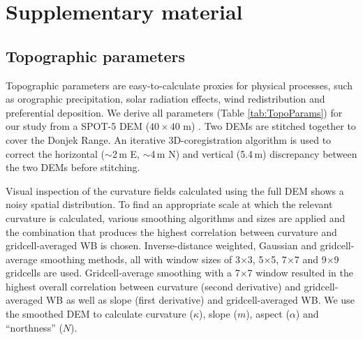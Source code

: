 \documentclass[onecolumn, letterpaper]{igs}
\begin{document}
\section*{Supplementary material}

\subsection*{Topographic parameters}


Topographic parameters are easy-to-calculate proxies for physical processes, such as orographic precipitation, solar radiation effects, wind redistribution and preferential deposition. We derive all parameters (Table \ref{tab:TopoParams}) for our study from a SPOT-5 DEM ($40\times40$ m) \citep{Korona2009}. Two DEMs are stitched together to cover the Donjek Range. An iterative 3D-coregistration algorithm \citep{Berthier2007} is used to correct the horizontal ($\sim$2\,m E, $\sim$4\,m N) and vertical (5.4\,m) discrepancy between the two DEMs before stitching. 

Visual inspection of the curvature fields calculated using the full DEM shows a noisy spatial distribution. To find an appropriate scale at which the relevant curvature is calculated, various smoothing algorithms and sizes are applied and the combination that produces the highest correlation between curvature and gridcell-averaged WB is chosen. Inverse-distance weighted, Gaussian and gridcell-average smoothing methods, all with window sizes of 3$\times$3, 5$\times$5, 7$\times$7 and 9$\times$9 gridcells are used. Gridcell-average smoothing with a 7$\times$7 window resulted in the highest overall correlation between curvature (second derivative) and gridcell-averaged WB as well as slope (first derivative) and gridcell-averaged WB. We use the smoothed DEM to calculate curvature ($\kappa$), slope ($m$), aspect ($\alpha$) and ``northness'' ($N$).
\end{document}
